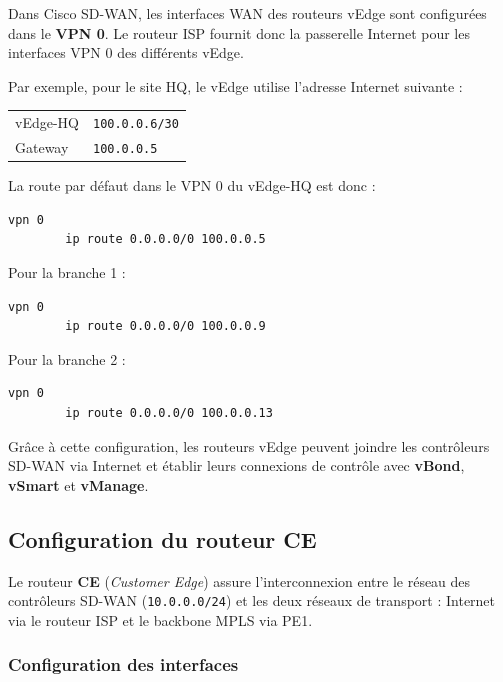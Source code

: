 \documentclass[12pt,a4paper,oneside]{report}
\begin{document}
	Dans Cisco SD-WAN, les interfaces WAN des routeurs vEdge sont configurées dans le \textbf{VPN 0}. Le routeur ISP fournit donc la passerelle Internet pour les interfaces VPN 0 des différents vEdge.
	
	Par exemple, pour le site HQ, le vEdge utilise l'adresse Internet suivante :
	
	\begin{center}
		\begin{tabular}{ll}
			vEdge-HQ & \texttt{100.0.0.6/30} \\
			Gateway & \texttt{100.0.0.5} \\
		\end{tabular}
	\end{center}
	
	La route par défaut dans le VPN 0 du vEdge-HQ est donc :
	
	\begin{lstlisting}[language=bash]
		vpn 0
		ip route 0.0.0.0/0 100.0.0.5
	\end{lstlisting}
	
	Pour la branche 1 :
	
	\begin{lstlisting}[language=bash]
		vpn 0
		ip route 0.0.0.0/0 100.0.0.9
	\end{lstlisting}
	
	Pour la branche 2 :
	
	\begin{lstlisting}[language=bash]
		vpn 0
		ip route 0.0.0.0/0 100.0.0.13
	\end{lstlisting}
	
	Grâce à cette configuration, les routeurs vEdge peuvent joindre les contrôleurs SD-WAN via Internet et établir leurs connexions de contrôle avec \textbf{vBond}, \textbf{vSmart} et \textbf{vManage}.
	\subsection{Configuration du routeur CE}
	
	Le routeur \textbf{CE} (\textit{Customer Edge}) assure l'interconnexion 
	entre le réseau des contrôleurs SD-WAN (\texttt{10.0.0.0/24}) et les 
	deux réseaux de transport : Internet via le routeur ISP et le backbone 
	MPLS via PE1.
	
	\subsubsection{Configuration des interfaces}
	
\end{document}
